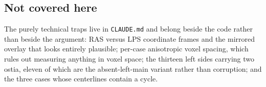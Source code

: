 \subsection*{Not covered here}

The purely technical traps live in \texttt{CLAUDE.md} and belong beside the code rather than beside
the argument: RAS versus LPS coordinate frames and the mirrored overlay that looks entirely
plausible; per-case anisotropic voxel spacing, which rules out measuring anything in voxel space;
the thirteen left sides carrying two ostia, eleven of which are the absent-left-main variant rather
than corruption; and the three cases whose centerlines contain a cycle.
